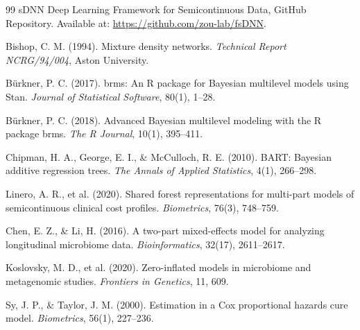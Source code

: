 \begin{thebibliography}{99}
sDNN Deep Learning Framework for Semicontinuous Data, GitHub Repository. Available at: \url{https://github.com/zou-lab/fsDNN}.

Bishop, C. M. (1994). Mixture density networks. \emph{Technical Report NCRG/94/004}, Aston University.

Bürkner, P. C. (2017). brms: An R package for Bayesian multilevel models using Stan. \emph{Journal of Statistical Software}, 80(1), 1--28.

Bürkner, P. C. (2018). Advanced Bayesian multilevel modeling with the R package brms. \emph{The R Journal}, 10(1), 395--411.

Chipman, H. A., George, E. I., \& McCulloch, R. E. (2010). BART: Bayesian additive regression trees. \emph{The Annals of Applied Statistics}, 4(1), 266--298.

Linero, A. R., et al. (2020). Shared forest representations for multi-part models of semicontinuous clinical cost profiles. \emph{Biometrics}, 76(3), 748--759.

Chen, E. Z., \& Li, H. (2016). A two-part mixed-effects model for analyzing longitudinal microbiome data. \emph{Bioinformatics}, 32(17), 2611--2617.

Koslovsky, M. D., et al. (2020). Zero-inflated models in microbiome and metagenomic studies. \emph{Frontiers in Genetics}, 11, 609.

Sy, J. P., \& Taylor, J. M. (2000). Estimation in a Cox proportional hazards cure model. \emph{Biometrics}, 56(1), 227--236.

\end{thebibliography}

